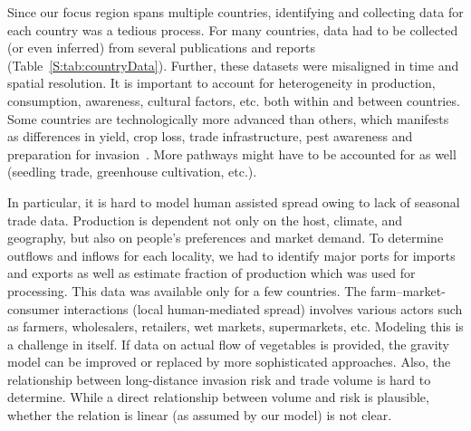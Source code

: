 \documentclass[11pt]{article}
\theoremstyle{definition}
\begin{document}
Since our focus region spans multiple countries, identifying and collecting
data for each country was a tedious process. For many countries, data had
to be collected (or even inferred) from several publications and reports
(Table~\ref{S:tab:countryData}). Further, these datasets were misaligned in
time and spatial resolution.  It is important to account for heterogeneity
in production, consumption, awareness, cultural factors, etc. both within
and between countries.  Some countries are technologically more advanced
than others, which manifests as differences in yield, crop loss, trade
infrastructure, pest awareness and preparation for
invasion~\cite{early2016global}. More pathways might have to be accounted
for as well (seedling trade, greenhouse cultivation, etc.).


In particular, it is hard to model human assisted spread owing to lack of
seasonal trade data. Production is dependent not only on the host, climate,
and geography, but also on people's preferences and market demand. To
determine outflows and inflows for each locality, we had to identify major
ports for imports and exports as well as estimate fraction of production
which was used for processing. This data was available only for a few
countries.  The farm--market-consumer interactions (local human-mediated
spread) involves various actors such as farmers, wholesalers, retailers,
wet markets, supermarkets, etc. Modeling this is a challenge in itself. If
data on actual flow of vegetables is provided, the gravity model can be
improved or replaced by more sophisticated approaches. Also, the
relationship between long-distance invasion risk and trade volume is hard
to determine. While a direct relationship between volume and risk is
plausible, whether the relation is linear (as assumed by our model) is not
clear.
\end{document}

